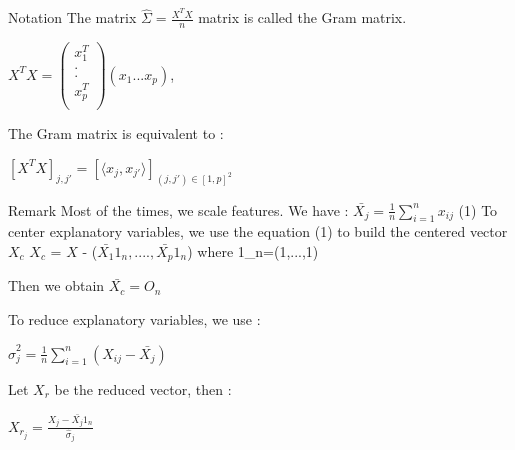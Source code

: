 \documentclass[unknownkeysallowed]{beamer}
\begin{document}
\begin{block}{Notation}
The matrix $\hat\Sigma=\frac{X^TX}{n}$ matrix is called the Gram matrix.
\begin{center}
    $X^TX=\begin{pmatrix}
   x_{1}^T  \\
   . \\
   . \\
   x_{p}^T  \\
\end{pmatrix}(x_{1}. . . x_{p}) $,
\end{center}

\end{block}
The Gram matrix is equivalent to :
\begin{center}
$[X^TX]_{j,j'}=[\langle x_{j},x_{j'}\rangle]_{(j,j')\in[1,p]^2}$    
\end{center}

\begin{block}{Remark}
Most of the times, we scale features.
\newline
We have : $\bar{X_{j}}=\frac{1}{n} \sum\limits_{i=1}^{n} x_{ij}$ (1)
\newline
 To center explanatory variables, we use the equation (1) to build the centered vector $X_{c}$
\newline
$X_{c}$ =  $X$ - ($\bar{X_{1}}1_n,....,\bar{X_{p}}1_n$) where 1_n=(1,...,1)

Then we obtain $\bar{X_{c}}=O_n$ 

To reduce explanatory variables, we use :
\newline
\begin{center}
$\hat\sigma_{j}^2=\frac{1}{n} \sum\limits_{i=1}^{n} (X_{ij}-\bar{X_{j}})$   
\end{center}
Let $X_r$ be the reduced vector, then :
\newline
\begin{center}
$X_{r_{j}}=\frac{X_{j}-\bar{X_{j}}1_n}{\hat\sigma_{j}}$    
\end{center}

\end{block}
\end{document}
